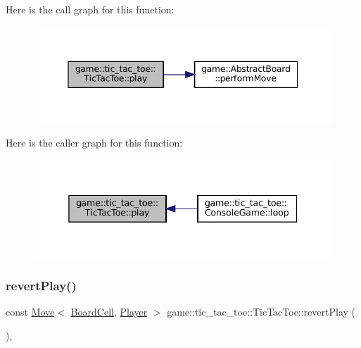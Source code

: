 Here is the call graph for this function\+:
\nopagebreak
\begin{figure}[H]
\begin{center}
\leavevmode
\includegraphics[width=345pt]{classgame_1_1tic__tac__toe_1_1_tic_tac_toe_a68edd6e6abdd924bc2eae503621492bb_cgraph}
\end{center}
\end{figure}
Here is the caller graph for this function\+:
\nopagebreak
\begin{figure}[H]
\begin{center}
\leavevmode
\includegraphics[width=338pt]{classgame_1_1tic__tac__toe_1_1_tic_tac_toe_a68edd6e6abdd924bc2eae503621492bb_icgraph}
\end{center}
\end{figure}
\mbox{\label{classgame_1_1tic__tac__toe_1_1_tic_tac_toe_a38a848001838eb4ccbafa9800f3cbfd4}} 
\subsubsection{\texorpdfstring{revert\+Play()}{revertPlay()}}
{\footnotesize\ttfamily const \hyperlink{structgame_1_1_move}{Move}$<$ \hyperlink{classgame_1_1tic__tac__toe_1_1_board_cell}{Board\+Cell}, \hyperlink{classgame_1_1tic__tac__toe_1_1_player}{Player} $>$ game\+::tic\+\_\+tac\+\_\+toe\+::\+Tic\+Tac\+Toe\+::revert\+Play (\begin{DoxyParamCaption}{ }\end{DoxyParamCaption})\hspace{0.3cm}{\ttfamily [override]}, {\ttfamily [virtual]}}



